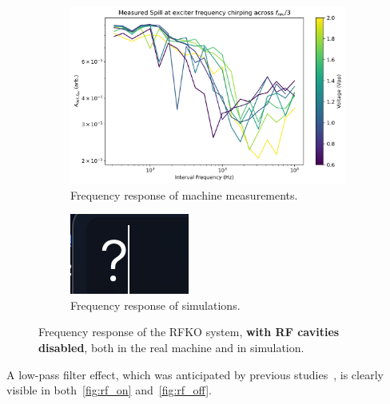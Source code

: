 \documentclass[11pt]{report}
\begin{document}
\begin{figure}[h]
  \centering
  \begin{subfigure}[b]{0.9\linewidth}
    \includegraphics*[width=\linewidth]{machine_rf_off.png}
    \caption{Frequency response of machine measurements.}
  \end{subfigure}
  \begin{subfigure}[b]{0.9\linewidth}
    \includegraphics*[width=\linewidth]{sim_rf_off.png}
    \caption{Frequency response of simulations.}
  \end{subfigure}
  \caption{Frequency response of the RFKO system, \textbf{with RF cavities disabled}, both in the real machine and in simulation.}\label{fig:rf_off}
\end{figure}

A low-pass filter effect, which was anticipated by previous studies~\cite{wepmp008}, is clearly visible in both~\autoref{fig:rf_on} and~\autoref{fig:rf_off}.
\end{document}
